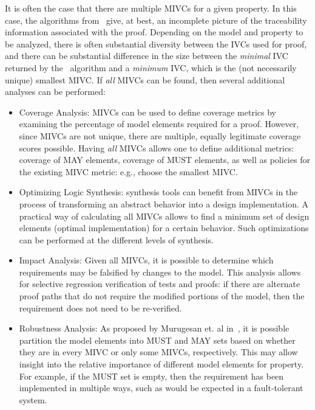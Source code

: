 It is often the case that there are multiple MIVCs for a given property.  In this case, the algorithms from~\cite{Ghass16} give, at best, an
incomplete picture of the traceability information associated with the proof.  Depending on the model and property to be analyzed, there is often substantial diversity between the IVCs used for proof, and there can be substantial difference in the size between the {\em minimal} IVC returned by the \ucbfalg\ algorithm and a {\em minimum} IVC, which is the (not necessarily unique) smallest MIVC.
 If {\em all} MIVCs can be found, then several additional analyses can be performed:
\begin{itemize}
    \item Coverage Analysis: MIVCs can be used to define coverage metrics by examining the percentage of model elements required for a proof.  However, since MIVCs are not unique, there are multiple, equally legitimate coverage scores possible.  Having \emph{all} MIVCs allows one to define additional metrics: coverage of MAY elements, coverage of MUST elements, as well as policies for the existing MIVC metric: e.g., choose the smallest MIVC. %
    \item Optimizing Logic Synthesis:  synthesis tools can benefit from MIVCs in the process of transforming an abstract behavior into a design implementation. A practical way of calculating all MIVCs allows to find a minimum set of design elements (optimal implementation) for a certain behavior. Such optimizations can be performed at the different levels of synthesis.
    \item Impact Analysis: Given all MIVCs, it is possible to determine which requirements may be falsified by changes to the model.  This analysis allows for selective regression verification of tests and proofs: if there are alternate proof paths that do not require the modified portions of the model, then the requirement does not need to be re-verified.
    \item Robustness Analysis: As proposed by Murugesan et. al in~\cite{Murugesan16:renext}, it is possible partition the model elements into MUST and MAY sets based on whether they are in every MIVC or only some MIVCs, respectively.  This may allow insight into the relative importance of different model elements for property.  For example, if the MUST set is empty, then the requirement has been implemented in multiple ways, such as would be expected in a fault-tolerant system.
\end{itemize}
